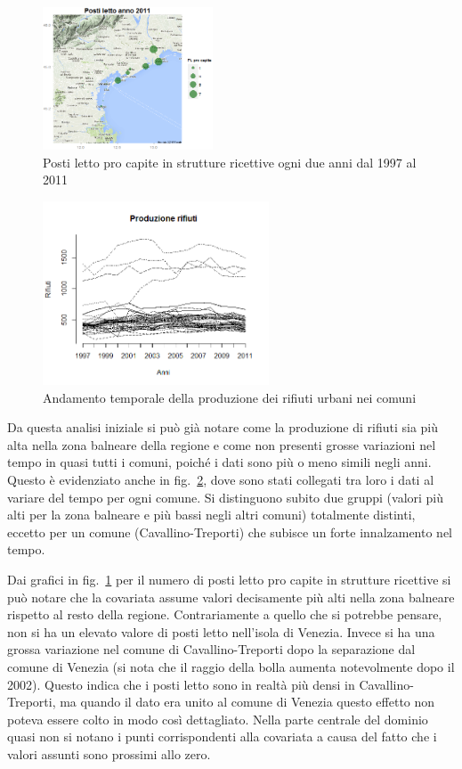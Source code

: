 \documentclass[a4paper,11pt,twoside,openright]{book}							%
\begin{document}
\begin{figure}[H]
	\includegraphics[trim=0cm 0cm 0cm 0cm,clip=true,width=0.45\textwidth]{Immagini/venezia_dati/PL2011.png}
	\caption{Posti letto pro capite in strutture ricettive ogni due anni dal 1997 al 2011}
	\label{fig:Ven_bubblePL}
\end{figure}
\newpage
\begin{figure}[t]
\centering
	\includegraphics[width=0.60\textwidth]{Immagini/Matplot.png}   
 \caption{Andamento temporale della produzione dei rifiuti urbani nei comuni}
   \label{fig:Ven_matplot}
\end{figure}
Da questa analisi iniziale si può già notare come la produzione di rifiuti sia più alta nella zona balneare della regione e come non presenti grosse variazioni nel tempo in quasi tutti i comuni, poiché i dati sono più o meno simili negli anni. Questo è evidenziato anche in fig.~\ref{fig:Ven_matplot}, dove sono stati collegati tra loro i dati al variare del tempo per ogni comune. Si distinguono subito due gruppi (valori più alti per la zona balneare e più bassi negli altri comuni) totalmente distinti, eccetto per un comune (Cavallino-Treporti) che subisce un forte innalzamento nel tempo.

Dai grafici in fig.~\ref{fig:Ven_bubblePL} per il numero di posti letto pro capite in strutture ricettive si può notare che la covariata assume valori decisamente più alti nella zona balneare rispetto al resto della regione. Contrariamente a quello che si potrebbe pensare, non si ha un elevato valore di posti letto nell'isola di Venezia. Invece si ha una grossa variazione nel comune di Cavallino-Treporti dopo la separazione dal comune di Venezia (si nota che il raggio della bolla aumenta notevolmente dopo il 2002). Questo indica che i posti letto sono in realtà più densi in Cavallino-Treporti, ma quando il dato era unito al comune di Venezia questo effetto non poteva essere colto in modo così dettagliato. Nella parte centrale del dominio quasi non si notano i punti corrispondenti alla covariata a causa del fatto che i valori assunti sono prossimi allo zero.
\end{document}
